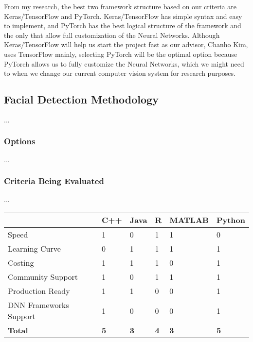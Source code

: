 From my research, the best two framework structure based on our criteria are Keras/TensorFlow and PyTorch. Keras/TensorFlow has simple syntax and easy to implement, and PyTorch has the best logical structure of the framework and the only that allow full customization of the Neural Networks. Although Keras/TensorFlow will help us start the project fast as our advisor, Chanho Kim, uses TensorFlow mainly, selecting PyTorch will be the optimal option because PyTorch allows us to fully customize the Neural Networks, which we might need to when we change our current computer vision system for research purposes. 

\subsection{Facial Detection Methodology}
...
\subsubsection{Options}
...

\subsubsection{Criteria Being Evaluated}
...

\begin{center}
\begin{tabular}{|l|l|l|l|l|l|}
\hline
           & \textbf{C++} & \textbf{Java} & \textbf{R} & \textbf{MATLAB} & \textbf{Python}\\ \hline
Speed &     1      &      0     &      1     &      1     & 0          \\ \hline
Learning Curve &     0      &     1      &      1     &     1      &    1       \\ \hline
Costing &     1      &     1      &     1      &    0       &       1    \\ \hline
Community Support &      1     &     0      &   1        &      1     &     1      \\ \hline
Production Ready &     1      &     1      &    0       &       0    &      1     \\ \hline
DNN Frameworks Support &     1      &      0     &     0      &        0   &   1        \\ \hline
\textbf{Total} &      \textbf{5}     &   \textbf{3}        &      \textbf{4}     &     \textbf{3}      &    \textbf{5}       \\ \hline
\end{tabular}
\end{center}

